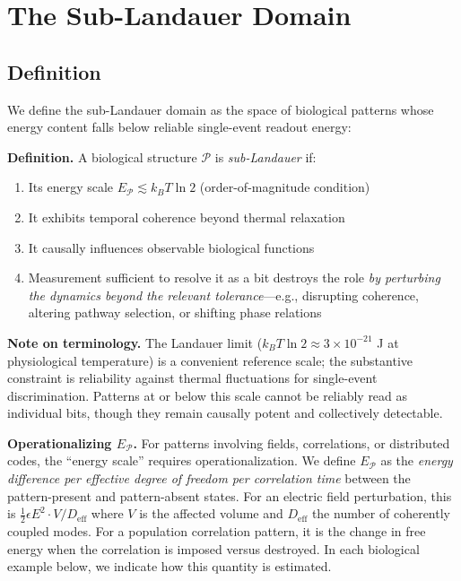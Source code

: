 \documentclass[12pt]{article}
\begin{document}
\section{The Sub-Landauer Domain}

\subsection{Definition}

We define the sub-Landauer domain as the space of biological patterns whose energy content falls below reliable single-event readout energy:

\textbf{Definition.} A biological structure $\mathcal{P}$ is \emph{sub-Landauer} if:
\begin{enumerate}
    \item Its energy scale $E_{\mathcal{P}} \lesssim k_B T \ln 2$ (order-of-magnitude condition)
    \item It exhibits temporal coherence beyond thermal relaxation
    \item It causally influences observable biological functions
    \item Measurement sufficient to resolve it as a bit destroys the role \emph{by perturbing the dynamics beyond the relevant tolerance}---e.g., disrupting coherence, altering pathway selection, or shifting phase relations
\end{enumerate}

\textbf{Note on terminology.} The Landauer limit ($k_B T \ln 2 \approx 3 \times 10^{-21}$ J at physiological temperature) is a convenient reference scale; the substantive constraint is reliability against thermal fluctuations for single-event discrimination. Patterns at or below this scale cannot be reliably read as individual bits, though they remain causally potent and collectively detectable.

\textbf{Operationalizing $E_{\mathcal{P}}$.} For patterns involving fields, correlations, or distributed codes, the ``energy scale'' requires operationalization. We define $E_{\mathcal{P}}$ as the \emph{energy difference per effective degree of freedom per correlation time} between the pattern-present and pattern-absent states. For an electric field perturbation, this is $\frac{1}{2}\epsilon E^2 \cdot V / D_{\text{eff}}$ where $V$ is the affected volume and $D_{\text{eff}}$ the number of coherently coupled modes. For a population correlation pattern, it is the change in free energy when the correlation is imposed versus destroyed. In each biological example below, we indicate how this quantity is estimated.
\end{document}
